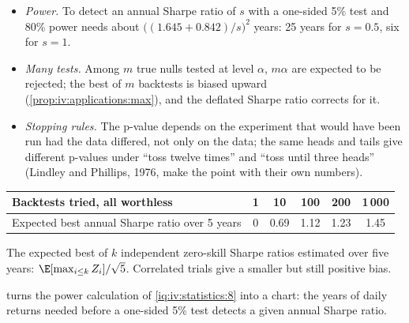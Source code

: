 \begin{itemize}
\item \emph{Power.} To detect an annual Sharpe ratio of $s$ with a one-sided 5\% test and 80\% power needs about
$\big((1.645 + 0.842)/s\big)^2$ years: 25 years for $s = 0.5$, six for $s = 1$.
\item \emph{Many tests.} Among $m$ true nulls tested at level $\alpha$, $m\alpha$ are expected to be rejected; the best
of $m$ backtests is biased upward (\cref{prop:iv:applications:max}), and the deflated Sharpe ratio corrects for it.
\item \emph{Stopping rules.} The p-value depends on the experiment that would have been run had the data differed,
not only on the data; the same heads and tails give different p-values under ``toss twelve times'' and ``toss until
three heads'' (Lindley and Phillips, 1976, make the point with their own numbers).
\end{itemize}

\begin{center}
\small
\begin{tabular}{@{}lccccc@{}}
\toprule
Backtests tried, all worthless & 1 & 10 & 100 & 200 & 1\,000 \\
\midrule
Expected best annual Sharpe ratio over 5 years & 0 & 0.69 & 1.12 & 1.23 & 1.45 \\
\bottomrule
\end{tabular}

\smallskip
{\small The expected best of $k$ independent zero-skill Sharpe ratios estimated over five years:
$\E[\max_{i \le k} Z_i]/\sqrt5$. Correlated trials give a smaller but still positive bias.}
\end{center}

 turns the power calculation of \cref{iq:iv:statistics:8} into a chart: the years of daily
returns needed before a one-sided 5\% test detects a given annual Sharpe ratio.

